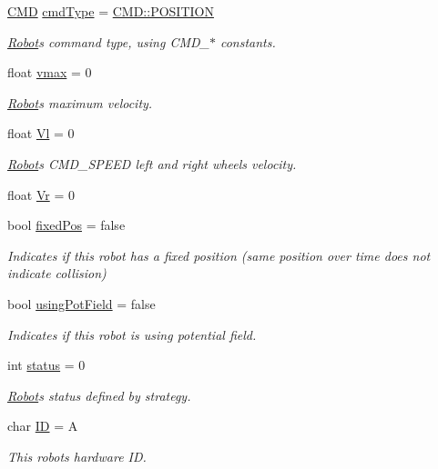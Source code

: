 \begin{DoxyCompactItemize}
\hyperlink{class_robots_adcc7ae7fbb9bdc57a26ee70fa1ae88e5}{C\+MD} \hyperlink{struct_robots_1_1_robot_a3b0d74c67bc694279130a2f280d7096a}{cmd\+Type} = \hyperlink{serial_w_8hpp_a440f0e10bb28b153f5661c934bc6b89f}{C\+M\+D\+::\+P\+O\+S\+I\+T\+I\+ON}
\begin{DoxyCompactList}\small\item\em \hyperlink{struct_robots_1_1_robot}{Robot}\textquotesingle{}s command type, using C\+M\+D\+\_\+$\ast$ constants. \end{DoxyCompactList}\item 
float \hyperlink{struct_robots_1_1_robot_a348bcae40a653cce3fd9fe42746d1bb8}{vmax} = 0
\begin{DoxyCompactList}\small\item\em \hyperlink{struct_robots_1_1_robot}{Robot}\textquotesingle{}s maximum velocity. \end{DoxyCompactList}\item 
float \hyperlink{struct_robots_1_1_robot_aa0bc346c181a40b29735bfec12d94ca7}{Vl} = 0
\begin{DoxyCompactList}\small\item\em \hyperlink{struct_robots_1_1_robot}{Robot}\textquotesingle{}s C\+M\+D\+\_\+\+S\+P\+E\+ED left and right wheel\textquotesingle{}s velocity. \end{DoxyCompactList}\item 
float \hyperlink{struct_robots_1_1_robot_a7f9ac93eb83da8ea2dbb8a9aa75ad9f1}{Vr} = 0
\item 
bool \hyperlink{struct_robots_1_1_robot_afebd5333f53eb0da7da943b43ebfde3a}{fixed\+Pos} = false
\begin{DoxyCompactList}\small\item\em Indicates if this robot has a fixed position (same position over time does not indicate collision) \end{DoxyCompactList}\item 
bool \hyperlink{struct_robots_1_1_robot_af1e1627b59f42d4b49db7a46c9c04389}{using\+Pot\+Field} = false
\begin{DoxyCompactList}\small\item\em Indicates if this robot is using potential field. \end{DoxyCompactList}\item 
int \hyperlink{struct_robots_1_1_robot_ad161e93e13655a26146a5b5cd3d8f34b}{status} = 0
\begin{DoxyCompactList}\small\item\em \hyperlink{struct_robots_1_1_robot}{Robot}\textquotesingle{}s status defined by strategy. \end{DoxyCompactList}\item 
char \hyperlink{struct_robots_1_1_robot_a3ce196fc3922dc0d256273d33f29da50}{ID} = \textquotesingle{}A\textquotesingle{}
\begin{DoxyCompactList}\small\item\em This robot\textquotesingle{}s hardware ID. \end{DoxyCompactList}\end{DoxyCompactItemize}


